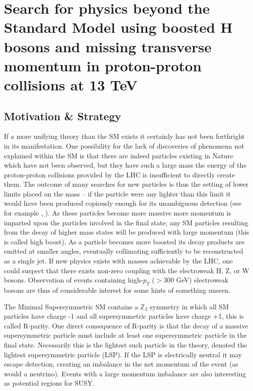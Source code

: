 \newcommand{\ttbar}{$\textrm{t}\bar{\textrm{t}}~$}
\newcommand{\bbbar}{$\textrm{b}\bar{\textrm{b}}~$}
\newcommand{\ptmiss}{$p_{T}^{\mathrm{miss}}~$}

\chapter{Search for physics beyond the Standard Model using boosted H bosons and missing transverse momentum in proton-proton collisions at 13 TeV}
\label{chap:analysis}

\section{Motivation \& Strategy}

If a more unifying theory than the SM exists it certainly has not been forthright in its manifestation. One possibility for the lack of discoveries of phenomena not explained within the SM is that there are indeed particles existing in Nature which have not been observed, but they have such a large mass the energy of the proton-proton collisions provided by the LHC is insufficient to directly create them. The outcome of many searches for new particles is thus the setting of lower limits placed on the mass -- if the particle were any lighter than this limit it would have been produced copiously enough for its unambiguous detection (see for example \cite{CMS-SUS-16-033}, \cite{CMS-SUS-15-002}). As these particles become more massive more momentum is imparted upon the particles involved in the final state; any SM particles resulting from the decay of higher mass states will be produced with large momentum (this is called high boost). As a particle becomes more boosted its decay products are emitted at smaller angles, eventually collimating sufficiently to be reconstructed as a single jet. If new physics exists with masses achievable by the LHC, one could suspect that there exists non-zero coupling with the electroweak H, Z, or W bosons. Observation of events containing high-$p_{T}$ ($>$300 GeV) electroweak bosons are thus of considerable interest for some hints of something unseen.

The Minimal Supersymmetric SM contains a $\mathbb{Z}_{2}$ symmetry in which all SM particles have charge -1 and all supersymmetric particles have charge +1, this is called R-parity\cite{susyprimer}. One direct consequence of R-parity is that the decay of a massive supersymmetric particle must include at least one supersymmetric particle in the final state. Necessarily this is the lightest such particle in the theory, denoted the lightest supersymmetric particle (LSP). If the LSP is electrically neutral it may escape detection, creating an imbalance in the net momentum of the event (as would a neutrino). Events with a large momentum imbalance are also interesting as potential regions for SUSY.

